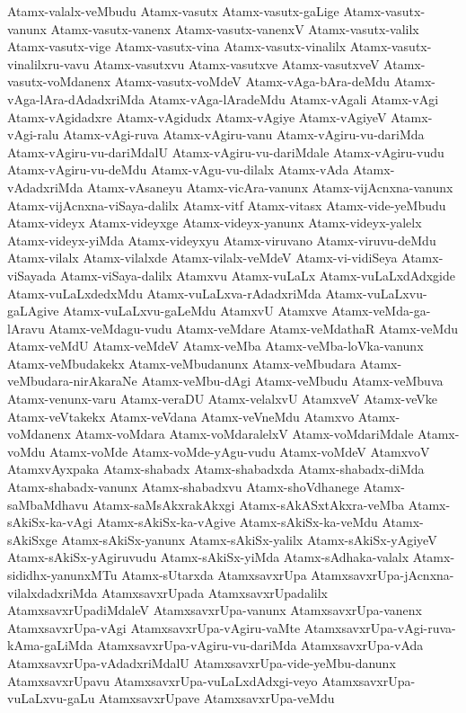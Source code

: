 {Atamx-valalx-veMbudu
Atamx-vasutx
Atamx-vasutx-gaLige
Atamx-vasutx-vanunx
Atamx-vasutx-vanenx
Atamx-vasutx-vanenxV
Atamx-vasutx-valilx
Atamx-vasutx-vige
Atamx-vasutx-vina
Atamx-vasutx-vinalilx
Atamx-vasutx-vinalilxru-vavu
Atamx-vasutxvu
Atamx-vasutxve
Atamx-vasutxveV
Atamx-vasutx-voMdanenx
Atamx-vasutx-voMdeV
Atamx-vAga-bAra-deMdu
Atamx-vAga-lAra-dAdadxriMda
Atamx-vAga-lAradeMdu
Atamx-vAgali
Atamx-vAgi
Atamx-vAgidadxre
Atamx-vAgidudx
Atamx-vAgiye
Atamx-vAgiyeV
Atamx-vAgi-ralu
Atamx-vAgi-ruva
Atamx-vAgiru-vanu
Atamx-vAgiru-vu-dariMda
Atamx-vAgiru-vu-dariMdalU
Atamx-vAgiru-vu-dariMdale
Atamx-vAgiru-vudu
Atamx-vAgiru-vu-deMdu
Atamx-vAgu-vu-dilalx
Atamx-vAda
Atamx-vAdadxriMda
Atamx-vAsaneyu
Atamx-vicAra-vanunx
Atamx-vijAcnxna-vanunx
Atamx-vijAcnxna-viSaya-dalilx
Atamx-vitf
Atamx-vitasx
Atamx-vide-yeMbudu
Atamx-videyx
Atamx-videyxge
Atamx-videyx-yanunx
Atamx-videyx-yalelx
Atamx-videyx-yiMda
Atamx-videyxyu
Atamx-viruvano
Atamx-viruvu-deMdu
Atamx-vilalx
Atamx-vilalxde
Atamx-vilalx-veMdeV
Atamx-vi-vidiSeya
Atamx-viSayada
Atamx-viSaya-dalilx
Atamxvu
Atamx-vuLaLx
Atamx-vuLaLxdAdxgide
Atamx-vuLaLxdedxMdu
Atamx-vuLaLxva-rAdadxriMda
Atamx-vuLaLxvu-gaLAgive
Atamx-vuLaLxvu-gaLeMdu
AtamxvU
Atamxve
Atamx-veMda-ga-lAravu
Atamx-veMdagu-vudu
Atamx-veMdare
Atamx-veMdathaR
Atamx-veMdu
Atamx-veMdU
Atamx-veMdeV
Atamx-veMba
Atamx-veMba-loVka-vanunx
Atamx-veMbudakekx
Atamx-veMbudanunx
Atamx-veMbudara
Atamx-veMbudara-nirAkaraNe
Atamx-veMbu-dAgi
Atamx-veMbudu
Atamx-veMbuva
Atamx-venunx-varu
Atamx-veraDU
Atamx-velalxvU
AtamxveV
Atamx-veVke
Atamx-veVtakekx
Atamx-veVdana
Atamx-veVneMdu
Atamxvo
Atamx-voMdanenx
Atamx-voMdara
Atamx-voMdaralelxV
Atamx-voMdariMdale
Atamx-voMdu
Atamx-voMde
Atamx-voMde-yAgu-vudu
Atamx-voMdeV
AtamxvoV
AtamxvAyxpaka
Atamx-shabadx
Atamx-shabadxda
Atamx-shabadx-diMda
Atamx-shabadx-vanunx
Atamx-shabadxvu
Atamx-shoVdhanege
Atamx-saMbaMdhavu
Atamx-saMsAkxrakAkxgi
Atamx-sAkASxtAkxra-veMba
Atamx-sAkiSx-ka-vAgi
Atamx-sAkiSx-ka-vAgive
Atamx-sAkiSx-ka-veMdu
Atamx-sAkiSxge
Atamx-sAkiSx-yanunx
Atamx-sAkiSx-yalilx
Atamx-sAkiSx-yAgiyeV
Atamx-sAkiSx-yAgiruvudu
Atamx-sAkiSx-yiMda
Atamx-sAdhaka-valalx
Atamx-sididhx-yanunxMTu
Atamx-sUtarxda
AtamxsavxrUpa
AtamxsavxrUpa-jAcnxna-vilalxdadxriMda
AtamxsavxrUpada
AtamxsavxrUpadalilx
AtamxsavxrUpadiMdaleV
AtamxsavxrUpa-vanunx
AtamxsavxrUpa-vanenx
AtamxsavxrUpa-vAgi
AtamxsavxrUpa-vAgiru-vaMte
AtamxsavxrUpa-vAgi-ruva-kAma-gaLiMda
AtamxsavxrUpa-vAgiru-vu-dariMda
AtamxsavxrUpa-vAda
AtamxsavxrUpa-vAdadxriMdalU
AtamxsavxrUpa-vide-yeMbu-danunx
AtamxsavxrUpavu
AtamxsavxrUpa-vuLaLxdAdxgi-veyo
AtamxsavxrUpa-vuLaLxvu-gaLu
AtamxsavxrUpave
AtamxsavxrUpa-veMdu
}
